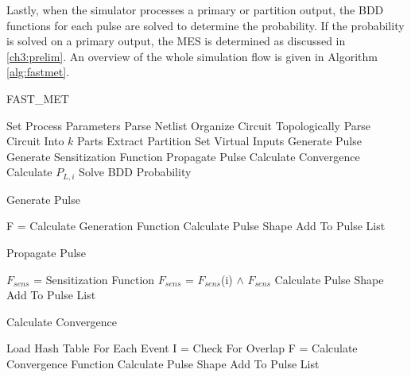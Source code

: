 Lastly, when the simulator processes a primary or partition output, the BDD functions for each pulse are solved to determine the probability. If the probability is solved on a primary output, the MES is determined as discussed in \ref{ch3:prelim}. An overview of the whole simulation flow is given in Algorithm \ref{alg:fastmet}.

\begin{algorithm}
	\caption{FAST\_MET} \label{alg:fastmet}
	\begin{algorithmic} [1]
		\STATE Set Process Parameters
		\STATE Parse Netlist
		\STATE Organize Circuit Topologically
		\STATE Parse Circuit Into $k$ Parts
			\STATE Extract Partition
			\STATE Set Virtual Inputs
				\STATE Generate Pulse
				\STATE Generate Sensitization Function
				\STATE Propagate Pulse
				\STATE Calculate Convergence
					\STATE Calculate $P_{L,i}$
					\STATE Solve BDD Probability
				\ENDIF
			\ENDFOR
		\ENDFOR		
	\end{algorithmic}
\end{algorithm}

\begin{algorithm}
	\caption{Generate Pulse} 
	\begin{algorithmic} [1]
		\STATE F = Calculate Generation Function
			\STATE Calculate Pulse Shape
			\STATE Add To Pulse List
		\ENDIF		
	\end{algorithmic}
\end{algorithm}

\begin{algorithm}
	\caption{Propagate Pulse} 
	\begin{algorithmic} [1]
			\STATE $F_{sens}$ = Sensitization Function
				\STATE $F_{sens}$ = $F_{sens}$(i) $\land$ $F_{sens}$
			\ENDFOR		
				\STATE Calculate Pulse Shape
				\STATE Add To Pulse List
			\ENDIF
	\end{algorithmic}
\end{algorithm}

\begin{algorithm}
	\caption{Calculate Convergence} 
	\begin{algorithmic} [1]
		\STATE Load Hash Table For Each Event
			\STATE I = Check For Overlap
				\STATE F = Calculate Convergence Function
					\STATE Calculate Pulse Shape
					\STATE Add To Pulse List
				\ENDIF
			\ENDIF
		\ENDFOR	
	\end{algorithmic}
\end{algorithm}
	
